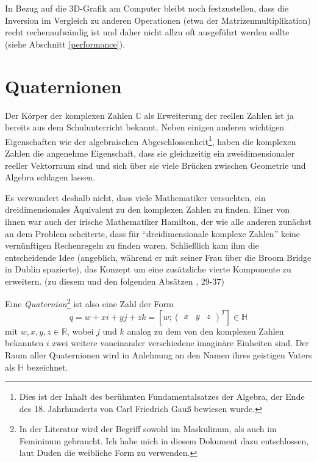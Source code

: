 In Bezug auf die 3D-Grafik am Computer bleibt noch festzustellen, dass die Inversion im Vergleich zu anderen Operationen (etwa der Matrizenmultiplikation) recht rechenaufwändig ist und daher nicht allzu oft ausgeführt werden sollte (siehe Abschnitt \ref{performance}).

\section{Quaternionen}
\label{quaternionmath}
Der Körper der komplexen Zahlen $\mathbb C$ als Erweiterung der reellen Zahlen ist ja bereits aus dem Schulunterricht bekannt. Neben einigen anderen wichtigen Eigenschaften wie der algebraischen Abgeschlossenheit\footnote{Dies ist der Inhalt des berühmten Fundamentalsatzes der Algebra, der Ende des 18. Jahrhunderts von Carl Friedrich Gauß bewiesen wurde.}, haben die komplexen Zahlen die angenehme Eigenschaft, dass sie gleichzeitig ein zweidimensionaler reeller Vektorraum sind und sich über sie viele Brücken zwischen Geometrie und Algebra schlagen lassen.

Es verwundert deshalb nicht, dass viele Mathematiker versuchten, ein dreidimensionales Äquivalent zu den komplexen Zahlen zu finden. Einer von ihnen war auch der irische Mathematiker Hamilton, der wie alle anderen zunächst an dem Problem scheiterte, dass für \enquote{dreidimensionale komplexe Zahlen} keine vernünftigen Rechenregeln zu finden waren. Schließlich kam ihm die entscheidende Idee (angeblich, während er mit seiner Frau über die Broom Bridge in Dublin spazierte), das Konzept um eine zusätzliche vierte Komponente zu erweitern. (zu diesem und den folgenden Absätzen \vgl \citep{quaternionrotation}, 29-37)

Eine \emph{Quaternion}\footnote{In der Literatur wird der Begriff sowohl im Maskulinum, als auch im Femininum gebraucht. Ich habe mich in diesem Dokument dazu entschlossen, laut Duden die weibliche Form zu verwenden.} ist also eine Zahl der Form
\begin{equation}
 q = w + xi + yj + zk = \left[ w; \begin{pmatrix} x & y & z \end{pmatrix}^T \right] \in \mathbb H
\end{equation}
mit $w, x, y, z \in \mathbb R$, wobei $j$ und $k$ analog zu dem von den komplexen Zahlen bekannten $i$ zwei weitere voneinander verschiedene imaginäre Einheiten sind. Der Raum aller Quaternionen wird in Anlehnung an den Namen ihres geistigen Vaters als $\mathbb H$ bezeichnet.

